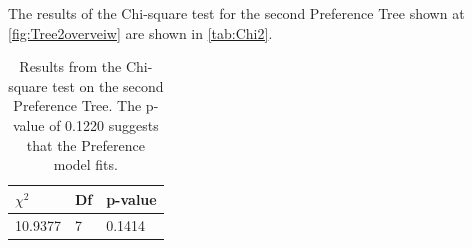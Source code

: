 \noindent
%
The results of the Chi-square test for the second Preference Tree shown at \autoref{fig:Tree2overveiw} are shown in \autoref{tab:Chi2}. 
%
\begin{table}[H]
\centering
\begin{tabular}{@{}lll@{}}
\toprule
$\chi^{2}$   & Df  & p-value \\ \midrule
10.9377      & 7   & 0.1414  \\ \bottomrule
\end{tabular}
\caption{Results from the Chi-square test on the second Preference Tree. The p-value of 0.1220 suggests that the Preference model fits.}
\label{tab:Chi2}
\end{table} 